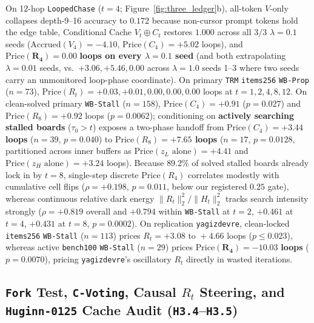 \documentclass[10pt,letterpaper]{article}
\begin{document}
On 12-hop \texttt{LoopedChase} ($t=4$; Figure~\ref{fig:three_ledger}b), all-token $V$-only collapses depth-9--16 accuracy to $0.172$ because non-cursor prompt tokens hold the edge table, Conditional Cache $V_t \oplus C_t$ restores $\mathbf{1.000}$ across all $3/3$ $\lambda=0.1$ seeds ($\mathrm{Accrued}(V_4) = -4.10$, $\mathrm{Price}(C_4) = \mathbf{+5.02}$ loops), and $\mathbf{\mathrm{Price}(R_4) = 0.00}$ \textbf{loops on every $\lambda=0.1$ seed} (and both extrapolating $\lambda=0.01$ seeds, vs.\ $+3.06, +5.46, 0.00$ across $\lambda=1.0$ seeds 1--3 where two seeds carry an unmonitored loop-phase coordinate). On primary \texttt{TRM} \texttt{items256} \texttt{WB-Prop} ($n=73$), $\mathrm{Price}(R_t) = +0.03, +0.01, \mathbf{0.00}, \mathbf{0.00}, \mathbf{0.00}$ loops at $t=1,2,4,8,12$. On clean-solved primary \texttt{WB-Stall} ($n=158$), $\mathrm{Price}(C_4) = +0.91$ ($p=0.027$) and $\mathrm{Price}(R_8) = +0.92$ loops ($p=0.0062$); conditioning on \textbf{actively searching stalled boards} ($\tau_0 > t$) exposes a two-phase handoff from \textbf{$\mathrm{Price}(C_4) = +3.44$ loops} ($n=39$, $p=0.040$) to \textbf{$\mathrm{Price}(R_8) = +7.65$ loops} ($n=17$, $p=0.0128$, partitioned across inner buffers as $\mathrm{Price}(z_L\text{ alone}) = +4.41$ and $\mathrm{Price}(z_H\text{ alone}) = +3.24$ loops). Because $89.2\%$ of solved stalled boards already lock in by $t=8$, single-step discrete $\mathrm{Price}(R_4)$ correlates modestly with cumulative cell flips ($\rho = +0.198$, $p=0.011$, below our registered $0.25$ gate), whereas continuous relative dark energy $\|R_t\|_2^2 / \|H_t\|_2^2$ tracks search intensity strongly ($\rho = +0.819$ overall and $\mathbf{+0.794}$ within \texttt{WB-Stall} at $t=2$, $+0.461$ at $t=4$, $+0.431$ at $t=8$, $p=0.0002$). On replication \texttt{yagizdevre}, clean-locked \texttt{items256} \texttt{WB-Stall} ($n=113$) prices $R_t = +3.08\text{ to }+4.66$ loops ($p \le 0.023$), whereas active \texttt{bench100} \texttt{WB-Stall} ($n=29$) prices $\mathbf{\mathrm{Price}(R_4) = -10.03}$ \textbf{loops} ($p=0.0070$), pricing \texttt{yagizdevre}'s oscillatory $R_t$ directly in wasted iterations.

\subsection{\texttt{Fork} Test, \texttt{C-Voting}, Causal \texorpdfstring{$R_t$}{R\_t} Steering, and \texttt{Huginn-0125} Cache Audit (\texttt{H3.4}--\texttt{H3.5})}
\end{document}
